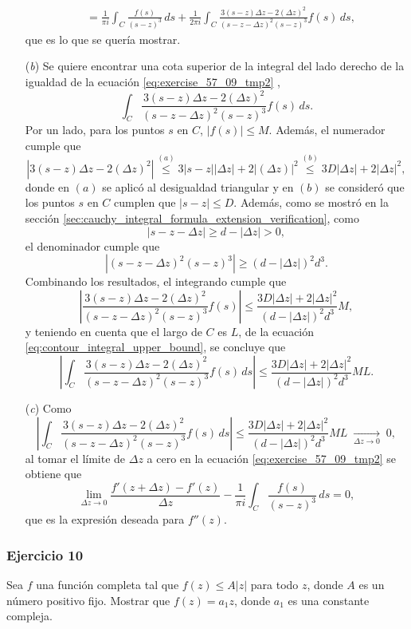 \documentclass[a4paper]{report}
\begin{document}
\begin{enumerate}
\begin{align*}
  &=\frac{1}{\pi i}\int_C\frac{f(s)}{(s-z)^3}\,ds+\frac{1}{2\pi i}\int_C\frac{3(s-z)\Delta z-2(\Delta z)^2}{(s-z-\Delta z)^2(s-z)^3}f(s)\,ds,
 \end{align*}
 que es lo que se quería mostrar. 
 \item[(\textit{b})] Se quiere encontrar una cota superior de la integral del lado derecho de la igualdad de la ecuación \ref{eq:exercise_57_09_tmp2} ,
 \[
  \int_C\frac{3(s-z)\Delta z-2(\Delta z)^2}{(s-z-\Delta z)^2(s-z)^3}f(s)\,ds.
 \]
 Por un lado, para los puntos \(s\) en \(C\), \(|f(s)|\leq M\). Además, el numerador cumple que 
 \[
  |3(s-z)\Delta z-2(\Delta z)^2|\overset{(a)}{\leq}3|s-z||\Delta z|+2|(\Delta z)|^2\overset{(b)}{\leq}3D|\Delta z|+2|\Delta z|^2, 
 \]
 donde en \((a)\) se aplicó al desigualdad triangular y en \((b)\) se consideró que los puntos \(s\) en \(C\) cumplen que \(|s-z|\leq D\). Además, como se mostró en la sección \ref{sec:cauchy_integral_formula_extension_verification}, como
 \[
  |s-z-\Delta z|\geq d-|\Delta z|>0, 
 \]
 el denominador cumple que 
 \[
  |(s-z-\Delta z)^2(s-z)^3|\geq (d-|\Delta z|)^2d^3.
 \]
 Combinando los resultados, el integrando cumple que 
 \[
  \left|\frac{3(s-z)\Delta z-2(\Delta z)^2}{(s-z-\Delta z)^2(s-z)^3}f(s)\right|\leq\frac{3D|\Delta z|+2|\Delta z|^2}{(d-|\Delta z|)^2d^3}M,
 \]
 y teniendo en cuenta que el largo de \(C\) es \(L\), de la ecuación \ref{eq:contour_integral_upper_bound}, se concluye que 
 \[
  \left|\int_C\frac{3(s-z)\Delta z-2(\Delta z)^2}{(s-z-\Delta z)^2(s-z)^3}f(s)\,ds\right|\leq\frac{3D|\Delta z|+2|\Delta z|^2}{(d-|\Delta z|)^2d^3}ML.
 \]
 \item[(\textit{c})] Como
  \[
  \left|\int_C\frac{3(s-z)\Delta z-2(\Delta z)^2}{(s-z-\Delta z)^2(s-z)^3}f(s)\,ds\right|\leq\frac{3D|\Delta z|+2|\Delta z|^2}{(d-|\Delta z|)^2d^3}ML\;\xrightarrow[\Delta z\to0]{}\;0,
 \]
 al tomar el límite de \(\Delta z\) a cero en la ecuación \ref{eq:exercise_57_09_tmp2} se obtiene que 
 \[
  \lim_{\Delta z\to0}\frac{f'(z+\Delta z)-f'(z)}{\Delta z}-\frac{1}{\pi i}\int_C\frac{f(s)}{(s-z)^3}\,ds=0,
 \]
 que es la expresión deseada para \(f''(z)\).
\end{enumerate}

\subsubsection*{Ejercicio 10}

Sea \(f\) una función completa tal que \(f(z)\leq A|z|\) para todo \(z\), donde \(A\) es un número positivo fijo. Mostrar que \(f(z)=a_1z\), donde \(a_1\) es una constante compleja.
\end{document}
